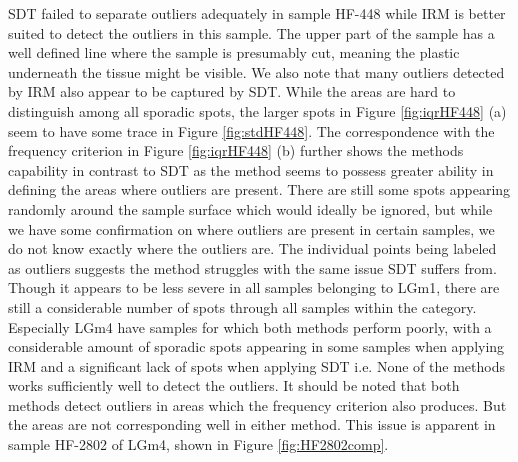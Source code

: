 SDT failed to separate outliers adequately in sample HF-448 while IRM is better suited to detect the outliers in this sample. The upper part of the sample has a well defined line where the sample is presumably cut, meaning the plastic underneath the tissue might be visible. We also note that many outliers detected by IRM also appear to be captured by SDT. While the areas are hard to distinguish among all sporadic spots, the larger spots in Figure \ref{fig:iqrHF448} (a) seem to have some trace in Figure \ref{fig:stdHF448}. The correspondence with the frequency criterion in Figure \ref{fig:iqrHF448} (b) further shows the methods capability in contrast to SDT as the method seems to possess greater ability in defining the areas where outliers are present. There are still some spots appearing randomly around the sample surface which would ideally be ignored, but while we have some confirmation on where outliers are present in certain samples, we do not know exactly where the outliers are. The individual points being labeled as outliers suggests the method struggles with the same issue SDT suffers from. Though it appears to be less severe in all samples belonging to LGm1, there are still a considerable number of spots through all samples within the category. Especially LGm4 have samples for which both methods perform poorly, with a considerable amount of sporadic spots appearing in some samples when applying IRM and a significant lack of spots when applying SDT i.e. None of the methods works sufficiently well to detect the outliers. It should be noted that both methods detect outliers in areas which the frequency criterion also produces. But the areas are not corresponding well in either method. This issue is apparent in sample HF-2802 of LGm4, shown in Figure \ref{fig:HF2802comp}.

